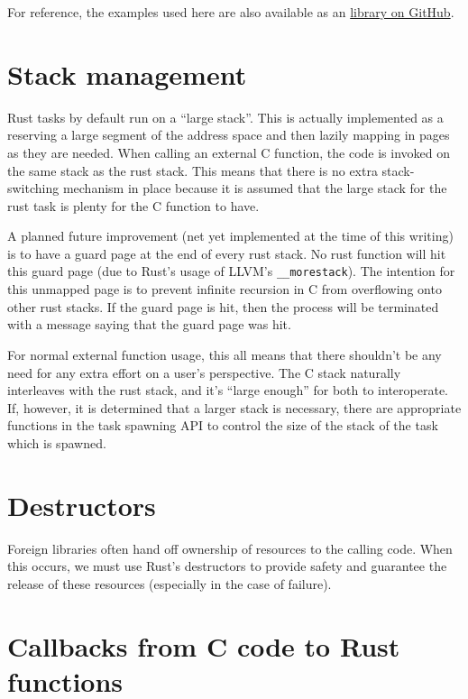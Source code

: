 \documentclass[]{article}
\begin{document}
For reference, the examples used here are also available as an
\href{https://github.com/thestinger/rust-snappy}{library on GitHub}.

\section{Stack management}\label{stack-management}

Rust tasks by default run on a ``large stack''. This is actually
implemented as a reserving a large segment of the address space and then
lazily mapping in pages as they are needed. When calling an external C
function, the code is invoked on the same stack as the rust stack. This
means that there is no extra stack-switching mechanism in place because
it is assumed that the large stack for the rust task is plenty for the C
function to have.

A planned future improvement (net yet implemented at the time of this
writing) is to have a guard page at the end of every rust stack. No rust
function will hit this guard page (due to Rust's usage of LLVM's
\texttt{\_\_morestack}). The intention for this unmapped page is to
prevent infinite recursion in C from overflowing onto other rust stacks.
If the guard page is hit, then the process will be terminated with a
message saying that the guard page was hit.

For normal external function usage, this all means that there shouldn't
be any need for any extra effort on a user's perspective. The C stack
naturally interleaves with the rust stack, and it's ``large enough'' for
both to interoperate. If, however, it is determined that a larger stack
is necessary, there are appropriate functions in the task spawning API
to control the size of the stack of the task which is spawned.

\section{Destructors}\label{destructors}

Foreign libraries often hand off ownership of resources to the calling
code. When this occurs, we must use Rust's destructors to provide safety
and guarantee the release of these resources (especially in the case of
failure).

\section{Callbacks from C code to Rust
functions}\label{callbacks-from-c-code-to-rust-functions}
\end{document}
